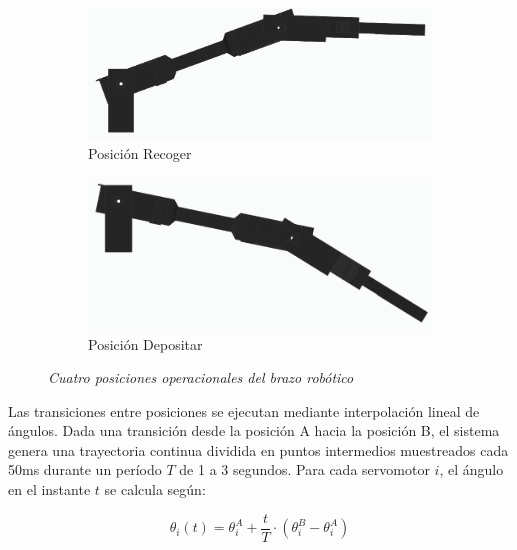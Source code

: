 \begin{figure}[H]
    \vspace{0.25cm}

    \begin{subfigure}[b]{0.45\textwidth}
        \centering
        \includegraphics[width=\textwidth]{imagenes/brazo_recoger.png}
        \caption{Posición Recoger}
    \end{subfigure}
    \hfill
    \begin{subfigure}[b]{0.45\textwidth}
        \centering
        \includegraphics[width=\textwidth]{imagenes/brazo_depositar.png}
        \caption{Posición Depositar}
    \end{subfigure}

    \caption{\textit{Cuatro posiciones operacionales del brazo robótico}}
    \label{fig:posiciones_brazo}
\end{figure}


Las transiciones entre posiciones se ejecutan mediante interpolación lineal de ángulos. Dada una transición desde la posición A hacia la posición B, el sistema genera una trayectoria continua dividida en puntos intermedios muestreados cada 50ms durante un período $T$ de 1 a 3 segundos. Para cada servomotor $i$, el ángulo en el instante $t$ se calcula según:

\begin{equation}
\theta_i(t) = \theta_i^A + \frac{t}{T} \cdot (\theta_i^B - \theta_i^A)
\end{equation}

